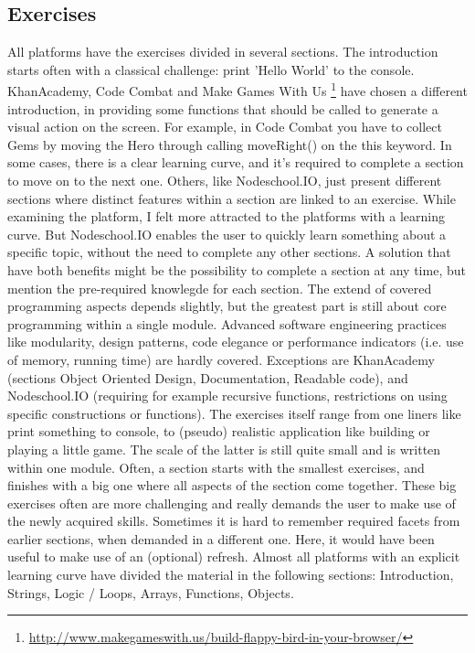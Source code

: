 \documentclass{article}
\begin{document}
\subsection{Exercises}
All platforms have the exercises divided in several sections. The introduction
starts often with a classical challenge: print 'Hello World' to the console. 
KhanAcademy, Code Combat and Make Games With Us
\footnote{\url{http://www.makegameswith.us/build-flappy-bird-in-your-browser/}}
have chosen a different introduction, in providing some functions that should be
called to generate a visual action on the screen. For example, in Code Combat 
you have to collect Gems by moving the Hero through calling moveRight() on 
the this keyword. \newline
In some cases, there is a clear learning curve, and it's required to complete a
section to move on to the next one. Others, like Nodeschool.IO, just present 
different sections where distinct features within a section are linked to an
exercise. While examining the platform, I felt more attracted to the platforms
with a learning curve. But Nodeschool.IO enables the user to quickly learn 
something about a specific topic, without the need to complete any other
sections. A solution that have both benefits might be the possibility to 
complete a section at any time, but mention the pre-required knowlegde for each
section. \newline
The extend of covered programming aspects depends slightly, but the greatest 
part is still about core programming within a single module. Advanced software
engineering practices like modularity, design patterns, code elegance or 
performance indicators (i.e. use of memory, running time) are hardly covered. 
Exceptions are KhanAcademy (sections Object Oriented Design, Documentation, 
Readable code), and Nodeschool.IO (requiring for example recursive functions, 
restrictions on using specific constructions or functions). \newline
The exercises itself range from one liners like print something to console, to
(pseudo) realistic application like building or playing a little game. 
The scale of the latter is still quite small and is written within one module.
Often, a section starts with the smallest exercises, and finishes with a big 
one where all aspects of the section come together. These big exercises often 
are more challenging and really demands the user to make use of the newly 
acquired skills. Sometimes it is hard to remember required facets from earlier
sections, when demanded in a different one. Here, it would have been useful to 
make use of an (optional) refresh. Almost all platforms with an explicit
learning curve have divided the 
material in the following sections: Introduction, Strings, Logic / Loops, 
Arrays, Functions, Objects. 
\end{document}

